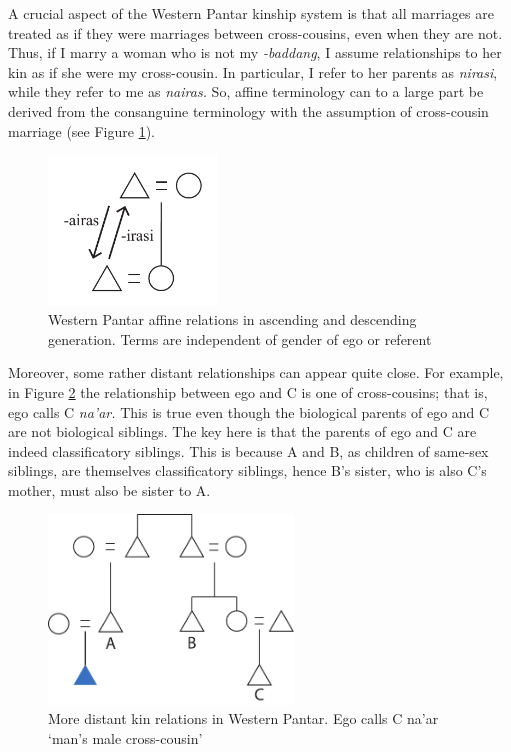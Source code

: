   A crucial aspect of the Western Pantar kinship system is that all marriages are treated as if they were marriages between cross-cousins, even when they are not. Thus, if I marry a woman who is not my \textit{-baddang}, I assume relationships to her kin as if she were my cross-cousin. In particular, I refer to her parents as \textit{nirasi}, while they refer to me as \textit{nairas.} So, affine terminology can to a large part be derived from the consanguine terminology with the assumption of cross-cousin marriage (see Figure \ref{fig:5:3}).


\begin{figure}\centering
\includegraphics[width=4.5cm]{figures/Holton_ch5_fig3.pdf}
\caption{ Western Pantar affine relations in ascending and descending generation. Terms are independent of gender of ego or referent}
\label{fig:5:3}
\end{figure}  

Moreover, some rather distant relationships can appear quite close. For example, in Figure \ref{fig:5:4} the relationship between ego and C is one of cross-cousins; that is, ego calls C \textit{na'ar.} This is true even though the biological parents of ego and C are not biological siblings. The key here is that the parents of ego and C are indeed classificatory siblings. This is because A and B, as children of same-sex siblings, are themselves classificatory siblings, hence B's sister, who is also C's mother, must also be sister to A. 

\begin{figure}\centering
\includegraphics[width=6.5cm]{figures/Holton_ch5_fig4.pdf}
\caption{More distant kin relations in Western Pantar. Ego calls C na'ar `man's male cross-cousin'}
\label{fig:5:4}
\end{figure}   

